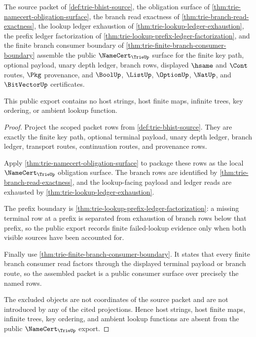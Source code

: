 \begin{theorem}\label{thm:trie-public-namecert-export}
The source packet of \autoref{def:trie-bhist-source}, the obligation surface
of \autoref{thm:trie-namecert-obligation-surface}, the branch read exactness
of \autoref{thm:trie-branch-read-exactness}, the lookup ledger exhaustion of
\autoref{thm:trie-lookup-ledger-exhaustion}, the prefix ledger factorization
of \autoref{thm:trie-lookup-prefix-ledger-factorization}, and the finite branch
consumer boundary of \autoref{thm:trie-finite-branch-consumer-boundary}
assemble the
public $\NameCert_{\TrieUp}$ surface for the finite key path, optional payload,
unary depth ledger, branch rows, displayed $\hsame$ and $\Cont$ routes,
$\Pkg$ provenance, and $\BoolUp$, $\ListUp$, $\OptionUp$, $\NatUp$, and
$\BitVectorUp$ certificates.

This public export contains no host strings, host finite maps, infinite trees,
key ordering, or ambient lookup function.
\end{theorem}
\begin{proof}
Project the scoped packet rows from \autoref{def:trie-bhist-source}. They are
exactly the finite key path, optional terminal payload, unary depth ledger,
branch ledger, transport routes, continuation routes, and provenance rows.

Apply \autoref{thm:trie-namecert-obligation-surface} to package these rows as
the local $\NameCert_{\TrieUp}$ obligation surface. The branch rows are
identified by \autoref{thm:trie-branch-read-exactness}, and the lookup-facing
payload and ledger reads are exhausted by
\autoref{thm:trie-lookup-ledger-exhaustion}.

The prefix boundary is
\autoref{thm:trie-lookup-prefix-ledger-factorization}: a missing terminal row
at a prefix is separated from exhaustion of branch rows below that prefix, so
the public export records finite failed-lookup evidence only when both visible
sources have been accounted for.

Finally use \autoref{thm:trie-finite-branch-consumer-boundary}. It states that
every finite branch consumer read factors through the displayed terminal
payload or branch route, so the assembled packet is a public consumer surface
over precisely the named rows.

The excluded objects are not coordinates of the source packet and are not
introduced by any of the cited projections. Hence host strings, host finite
maps, infinite trees, key ordering, and ambient lookup functions are absent
from the public $\NameCert_{\TrieUp}$ export.
\end{proof}

